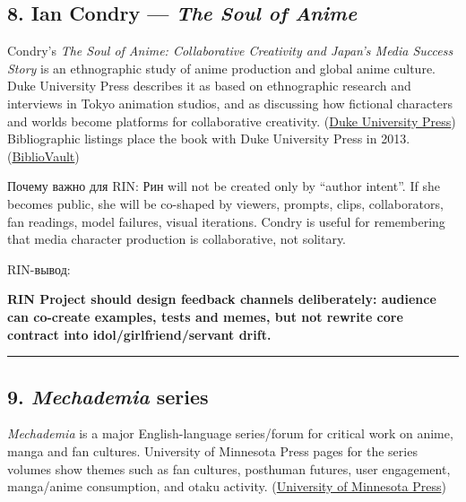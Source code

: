 \subsection*{\texorpdfstring{8. Ian Condry --- \emph{The Soul of
Anime}}{8. Ian Condry --- The Soul of Anime}}

Condry's \emph{The Soul of Anime: Collaborative Creativity and Japan's
Media Success Story} is an ethnographic study of anime production and
global anime culture. Duke University Press describes it as based on
ethnographic research and interviews in Tokyo animation studios, and as
discussing how fictional characters and worlds become platforms for
collaborative creativity.
(\href{https://www.dukeupress.edu/The-Soul-of-Anime/?utm_source=chatgpt.com}{Duke
University Press}) Bibliographic listings place the book with Duke
University Press in 2013.
(\href{https://www.bibliovault.org/BV.book.epl?ISBN=9780822353942\&utm_source=chatgpt.com}{BiblioVault})

Почему важно для RIN: Рин will not be created only by ``author intent''.
If she becomes public, she will be co-shaped by viewers, prompts, clips,
collaborators, fan readings, model failures, visual iterations. Condry
is useful for remembering that media character production is
collaborative, not solitary.

RIN-вывод:

\textbf{RIN Project should design feedback channels deliberately:
audience can co-create examples, tests and memes, but not rewrite core
contract into idol/\hspace{0pt}girlfriend/\hspace{0pt}servant drift.}

\begin{center}\rule{0.5\linewidth}{0.5pt}\end{center}

\subsection*{\texorpdfstring{9. \emph{Mechademia}
series}{9. Mechademia series}}

\emph{Mechademia} is a major English-language series/\hspace{0pt}forum for critical
work on anime, manga and fan cultures. University of Minnesota Press
pages for the series volumes show themes such as fan cultures, posthuman
futures, user engagement, manga/\hspace{0pt}anime consumption, and otaku activity.
(\href{https://www.upress.umn.edu/9781452915654/mechademia-5/?utm_source=chatgpt.com}{University
of Minnesota Press})

